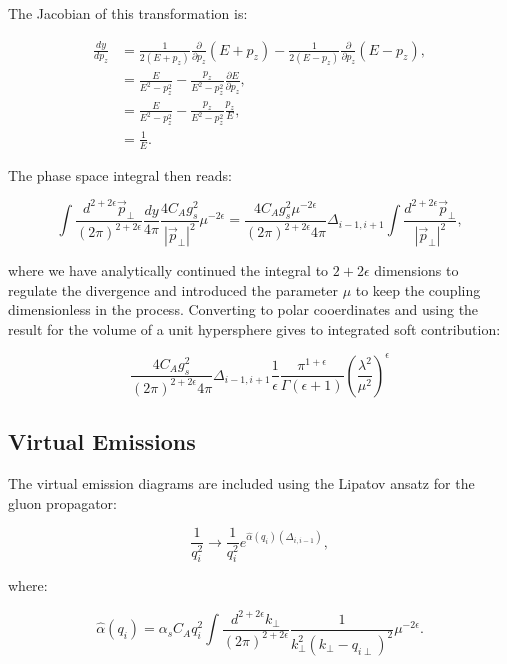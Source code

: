 		The Jacobian of this transformation is:

		\begin{align}
			\frac{dy}{dp_z} &= \frac{1}{2(E+p_z)} \frac{\partial}{\partial p_z}(E+p_z) - \frac{1}{2(E-p_z)}\frac{\partial}{\partial p_z}(E-p_z),\\
			&= \frac{E}{E^2-p_z^2} - \frac{p_z}{E^2-p_z^2}\frac{\partial E}{\partial p_z},\\
			&= \frac{E}{E^2-p_z^2} - \frac{p_z}{E^2-p_z^2}\frac{p_z}{E},\\
			&= \frac{1}{E}.
		\end{align}

		The phase space integral then reads:

		\begin{equation}
			\int\frac{d^{2+2\epsilon}\vec{p}_{\perp}}{(2\pi)^{2+2\epsilon}}\frac{dy}{4\pi}\frac{4C_Ag_s^2}
				{|\vec{p}_\perp|^2}\mu^{-2\epsilon} = \frac{4C_Ag_s^2\mu^{-2\epsilon}}{(2\pi)^{2+2\epsilon}4\pi}
				\Delta_{i-1, i+1}\int\frac{d^{2+2\epsilon}\vec{p}_{\perp}}{|\vec{p}_\perp|^2},
		\end{equation}

		where we have analytically continued the integral to $2+2\epsilon$ dimensions to regulate the
		divergence and introduced the parameter $\mu$ to keep the coupling dimensionless in the process.
		Converting to polar cooerdinates and using the result for the volume of a unit hypersphere gives
		to integrated soft contribution:

		\begin{equation}
			\frac{4C_Ag_s^2}{(2\pi)^{2+2\epsilon}4\pi}\Delta_{i-1, i+1}\frac{1}{\epsilon}\frac{\pi^{1+\epsilon}}
				{\Gamma(\epsilon+1)}\left(\frac{\lambda^2}{\mu^2}\right)^\epsilon
				\label{eqn:soft}
		\end{equation}

	\subsection{Virtual Emissions}
	\label{sub:subsection_name}

		The virtual emission diagrams are included using the Lipatov ansatz for the gluon propagator:

		\begin{equation}
			\frac{1}{q_i^2}\longrightarrow\frac{1}{q_i^2}e^{\hat{\alpha}(q_i)(\Delta_{i,i-1})},
		\end{equation}

		where:

		\begin{equation}
			\hat{\alpha}(q_i) = \alpha_sC_Aq_i^2\int \frac{d^{2+2\epsilon}k_{\perp}}{(2\pi)^{2+2\epsilon}}
			\frac{1}{k^2_\perp(k_\perp - q_{i\perp})^2}\mu^{-2\epsilon}.
		\end{equation}


